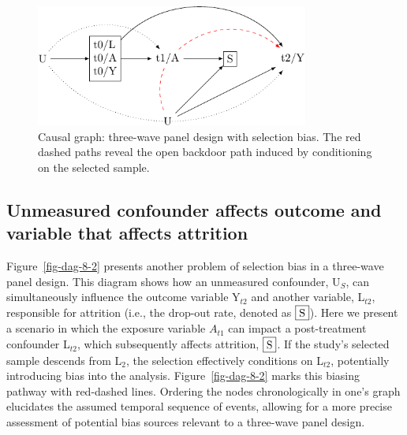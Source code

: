 \documentclass[
  singlecolumn]{report}
\begin{document}
\begin{figure}

{\centering \includegraphics[width=0.8\textwidth,height=\textheight]{causal-dags_files/figure-pdf/fig-dag-8-1.pdf}

}

\caption{\label{fig-dag-8}Causal graph: three-wave panel design with
selection bias. The red dashed paths reveal the open backdoor path
induced by conditioning on the selected sample.}

\end{figure}

\hypertarget{unmeasured-confounder-affects-outcome-and-variable-that-affects-attrition}{%
\subsection{Unmeasured confounder affects outcome and variable that
affects
attrition}\label{unmeasured-confounder-affects-outcome-and-variable-that-affects-attrition}}

Figure~\ref{fig-dag-8-2} presents another problem of selection bias in a
three-wave panel design. This diagram shows how an unmeasured
confounder, U\(_S\), can simultaneously influence the outcome variable
Y\(_{t2}\) and another variable, L\(_{t2}\), responsible for attrition
(i.e., the drop-out rate, denoted as \(\framebox{S}\)). Here we present
a scenario in which the exposure variable \(A_{t1}\) can impact a
post-treatment confounder L\(_{t2}\), which subsequently affects
attrition, \(\framebox{S}\). If the study's selected sample descends
from L\(_2\), the selection effectively conditions on L\(_{t2}\),
potentially introducing bias into the analysis. Figure~\ref{fig-dag-8-2}
marks this biasing pathway with red-dashed lines. Ordering the nodes
chronologically in one's graph elucidates the assumed temporal sequence
of events, allowing for a more precise assessment of potential bias
sources relevant to a three-wave panel design.
\end{document}
